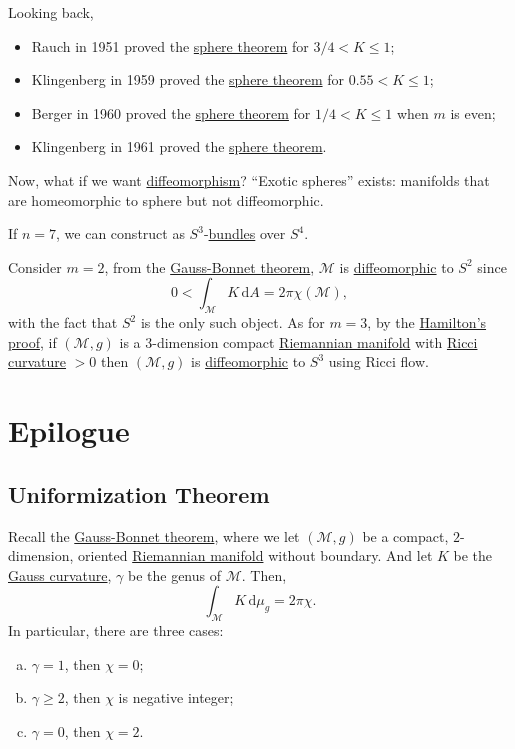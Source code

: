 Looking back,
\begin{itemize}
	\item Rauch in 1951 proved the \hyperref[thm:sphere*]{sphere theorem} for \(3 / 4 < K \leq 1\);
	\item Klingenberg in 1959 proved the \hyperref[thm:sphere*]{sphere theorem} for \(0.55 < K \leq 1\);
	\item Berger in 1960 proved the \hyperref[thm:sphere*]{sphere theorem} for \(1 / 4 < K \leq 1\) when \(m\) is even;
	\item Klingenberg in 1961 proved the \hyperref[thm:sphere*]{sphere theorem}.
\end{itemize}

Now, what if we want \hyperref[def:diffeomorphism]{diffeomorphism}? ``Exotic spheres'' exists: manifolds that are homeomorphic to sphere but not diffeomorphic.

\begin{eg}[J. Milnor]
	If \(n = 7\), we can construct as \(S^3\)-\hyperref[def:bundle]{bundles} over \(S^4\).
\end{eg}

Consider \(m = 2\), from the \hyperref[thm:Gauss-Bonnet]{Gauss-Bonnet theorem}, \(\mathcal{M} \) is \hyperref[def:diffeomorphic]{diffeomorphic} to \(S^2\) since
\[
	0 < \int _\mathcal{M} K \,\mathrm{d} A = 2 \pi \chi (\mathcal{M} ),
\]
with the fact that \(S^2\) is the only such object. As for \(m = 3\), by the \hyperref[thm:Hamilton]{Hamilton's proof}, if \((\mathcal{M} , g)\) is a \(3\)-dimension compact \hyperref[def:Riemannian-manifold]{Riemannian manifold} with \hyperref[def:Ricci-curvature]{Ricci curvature} \(> 0\) then \((\mathcal{M} , g)\) is \hyperref[def:diffeomorphic]{diffeomorphic} to \(S^3\) using Ricci flow.

\begin{theorem}

\end{theorem}

\chapter{Epilogue}
\section{Uniformization Theorem}
Recall the \hyperref[thm:Gauss-Bonnet]{Gauss-Bonnet theorem}, where we let \((\mathcal{M} , g)\) be a compact, \(2\)-dimension, oriented \hyperref[def:Riemannian-manifold]{Riemannian manifold} without boundary. And let \(K\) be the \hyperref[rmk:Gauss-curvature]{Gauss curvature}, \(\gamma \) be the genus of \(\mathcal{M} \). Then,
\[
	\int _\mathcal{M} K \,\mathrm{d} \mu _g = 2 \pi \chi .
\]
In particular, there are three cases:
\begin{enumerate}[(a)]
	\item \(\gamma = 1\), then \(\chi = 0\);
	\item \(\gamma \geq 2\), then \(\chi\) is negative integer;
	\item \(\gamma = 0\), then \(\chi = 2\).
\end{enumerate}

